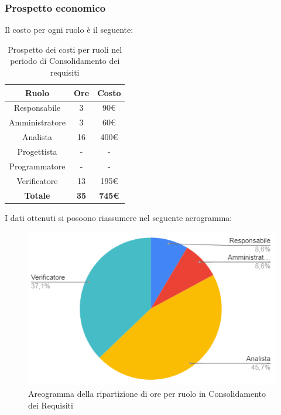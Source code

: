 \subsubsection{Prospetto economico}
Il costo per ogni ruolo è il seguente:
\begin{table}[H]
		\begin{center}
			\setlength{\aboverulesep}{0pt}
			\setlength{\belowrulesep}{0pt}
			\setlength{\extrarowheight}{.75ex}
			\begin{tabular}{ c c c }
				\rowcolor{AzzurroGruppo!30} 
				\textbf{Ruolo} & \textbf{Ore} & \textbf{Costo}  \\
				\toprule
				Responsabile   & 3 & 90€ \\
				Amministratore & 3 & 60€ \\
				Analista       & 16 & 400€ \\
				Progettista    & - & - \\
				Programmatore  & - & - \\
				Verificatore   & 13 & 195€ \\
				\textbf{Totale} & \textbf{35} & \textbf{745€} \\
				\bottomrule
			\end{tabular}
			\caption{ Prospetto dei costi per ruoli nel periodo di Consolidamento dei requisiti}
		\end{center}
	\end{table}
I dati ottenuti si posoono riassumere nel seguente aerogramma:
\begin{figure}[H]
    \centering
    \includegraphics[scale = 0.5]{components/img/consolidamento_torta.png}
    \caption{ Areogramma della ripartizione di ore per ruolo in Consolidamento dei Requisiti}
    \label{fig:logo}
\end{figure}
